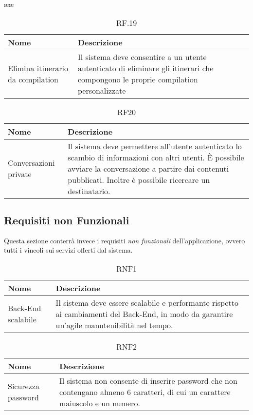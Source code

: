 ææ\documentclass{natourDoc}
\begin{document}
	\begin{table}[H]
		\centering
		\begin{tabular}{ |p{5cm}|p{10.3cm}| }
			\hline
			\rowcolor{PineGreen!70}
			\textbf{Nome} & \textbf{Descrizione} \\
			\hline
			Elimina itinerario da compilation & Il sistema deve consentire a un utente autenticato di eliminare gli itinerari
			che compongono le proprie compilation personalizzate \\
			\hline
		\end{tabular}
		\caption{RF.19}
		\label{table:19}
	\end{table}

	\begin{table}[H]
		\centering
		\begin{tabular}{ |p{5cm}|p{10.3cm}| }
			\hline
			\rowcolor{PineGreen!70}
			\textbf{Nome} & \textbf{Descrizione} \\
			\hline
			Conversazioni private & Il sistema deve permettere all'utente autenticato lo scambio di informazioni con altri utenti.
			È possibile avviare la conversazione a partire dai contenuti pubblicati. Inoltre è possibile ricercare un destinatario. \\
			\hline
		\end{tabular}
		\caption{RF20}
		\label{table:20}
	\end{table}

	\newpage

	\subsection{Requisiti non Funzionali}
	Questa sezione conterrà invece i requisiti \textit{non funzionali} dell'applicazione, ovvero tutti i vincoli sui servizi offerti dal sistema.

	\begin{table}[H]
		\centering
		\begin{tabular}{ |p{5cm}|p{10.3cm}| } 
			\hline
			\rowcolor{PineGreen!70}
			\textbf{Nome} & \textbf{Descrizione} \\
			\hline
			Back-End scalabile & Il sistema deve essere scalabile e performante rispetto ai cambiamenti del Back-End,
			in modo da garantire un'agile manutenibilità nel tempo. \\
			\hline
		\end{tabular}
		\caption{RNF1}
		\label{table:21}
	\end{table}
	
	\begin{table}[H]
		\centering
		\begin{tabular}{ |p{5cm}|p{10.3cm}| } 
			\hline
			\rowcolor{PineGreen!70}
			\textbf{Nome} & \textbf{Descrizione} \\
			\hline
			Sicurezza password & Il sistema non consente di inserire password che non contengano 
			almeno 6 caratteri, di cui un carattere maiuscolo e un numero.\\
			\hline
		\end{tabular}
		\caption{RNF2}
		\label{table:22}
	\end{table}
\end{document}
